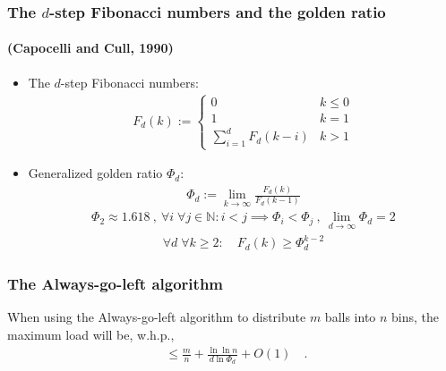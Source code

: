 \documentclass[professionalfonts]{beamer}
\DeclareMathOperator{\loadAgl}{L_{\max}^{Agl}}
\begin{document}
\begin{frame}
\frametitle{The $d$-step Fibonacci numbers and the golden ratio}
\framesubtitle{(Capocelli and Cull, 1990)}

\begin{itemize}
\item The \alert{$d$-step} Fibonacci numbers:
  \begin{align*}
    F_d(k) := \begin{cases}
      0               & k \leq 0\\
      1               & k = 1\\
      \sum_{i=1}^{d}F_d(k-i) & k > 1
    \end{cases}
  \end{align*}
\item Generalized \alert{golden ratio} $\Phi_d$:
  \begin{align*}
    \Phi_d := \lim_{k \rightarrow \infty} \frac{F_d(k)}{F_d(k-1)}
  \end{align*}
  \begin{align*}
    \Phi_2 \approx 1.618 \  , \ \forall i\; \forall j \in \mathbb{N}: i < j
    \implies \Phi_i < \Phi_j \ , \ \lim_{d\rightarrow \infty} \Phi_d = 2
  \end{align*}
  \begin{align*}
    \forall d\; \forall k\geq	2: \quad F_d(k) \geq \Phi_d^{k-2}
  \end{align*}
\end{itemize}
\end{frame}

\newcommand\theoremVocking{
\begin{theorem}[V\"ocking, 2003]
When using the \alert{Always-go-left} algorithm to distribute $m$ balls into $n$ bins, the maximum load will be, w.h.p.,
\begin{align*}
\loadAgl \leq \frac{m}{n} + \frac{\ln \ln n}{d \ln \Phi_d} + O(1) \quad .
\end{align*}
\end{theorem}
}

\begin{frame}
\frametitle{The Always-go-left algorithm}
\aglAlgorithm
\theoremVocking
\end{frame}
\end{document}
